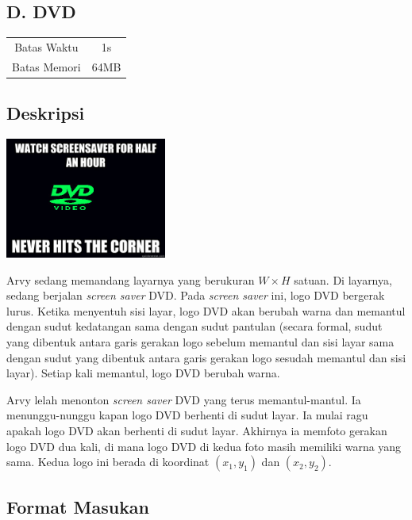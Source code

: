 \documentclass{article}
\begin{document}
\begin{center}
    \section*{D. DVD} %

    \begin{tabular}{ | c c | }
        \hline
        Batas Waktu  & 1s \\    %
        Batas Memori & 64MB \\  %
        \hline
    \end{tabular}
\end{center}

\subsection*{Deskripsi}

\begin{center}
    \includegraphics[width=200px]{meme}
\end{center}

Arvy sedang memandang layarnya yang berukuran $W \times H$ satuan.
Di layarnya, sedang berjalan \textit{screen saver} DVD.
Pada \textit{screen saver} ini, logo DVD bergerak lurus.
Ketika menyentuh sisi layar, logo DVD akan berubah warna dan memantul dengan sudut kedatangan sama dengan sudut pantulan (secara formal, sudut yang dibentuk antara garis gerakan logo sebelum memantul dan sisi layar sama dengan sudut yang dibentuk antara garis gerakan logo sesudah memantul dan sisi layar).
Setiap kali memantul, logo DVD berubah warna.

Arvy lelah menonton \textit{screen saver} DVD yang terus memantul-mantul.
Ia menunggu-nunggu kapan logo DVD berhenti di sudut layar.
Ia mulai ragu apakah logo DVD akan berhenti di sudut layar.
Akhirnya ia memfoto gerakan logo DVD dua kali, di mana logo DVD di kedua foto masih memiliki warna yang sama. Kedua logo ini berada di koordinat $(x_1, y_1)$ dan $(x_2, y_2)$.

\subsection*{Format Masukan}
\end{document}
